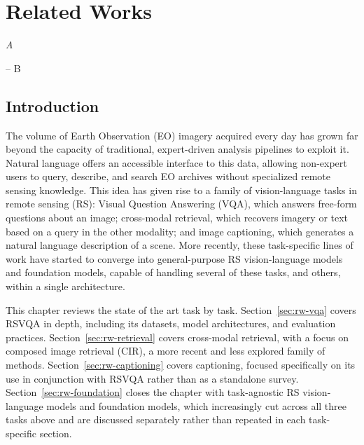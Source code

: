 \chapter{Related Works}
\epigraph{\itshape  A}{-- B}

\startcontents[chapters]
\printmyminitoc{
}

\section{Introduction}
\label{sec:rw-intro}

The volume of Earth Observation (EO) imagery acquired every day has grown far beyond the capacity of traditional, expert-driven analysis pipelines to exploit it. Natural language offers an accessible interface to this data, allowing non-expert users to query, describe, and search EO archives without specialized remote sensing knowledge. This idea has given rise to a family of vision-language tasks in remote sensing (RS): Visual Question Answering (VQA), which answers free-form questions about an image; cross-modal retrieval, which recovers imagery or text based on a query in the other modality; and image captioning, which generates a natural language description of a scene. More recently, these task-specific lines of work have started to converge into general-purpose RS vision-language models and foundation models, capable of handling several of these tasks, and others, within a single architecture.

This chapter reviews the state of the art task by task. Section~\ref{sec:rw-vqa} covers RSVQA in depth, including its datasets, model architectures, and evaluation practices. Section~\ref{sec:rw-retrieval} covers cross-modal retrieval, with a focus on composed image retrieval (CIR), a more recent and less explored family of methods. Section~\ref{sec:rw-captioning} covers captioning, focused specifically on its use in conjunction with RSVQA rather than as a standalone survey. Section~\ref{sec:rw-foundation} closes the chapter with task-agnostic RS vision-language models and foundation models, which increasingly cut across all three tasks above and are discussed separately rather than repeated in each task-specific section.

